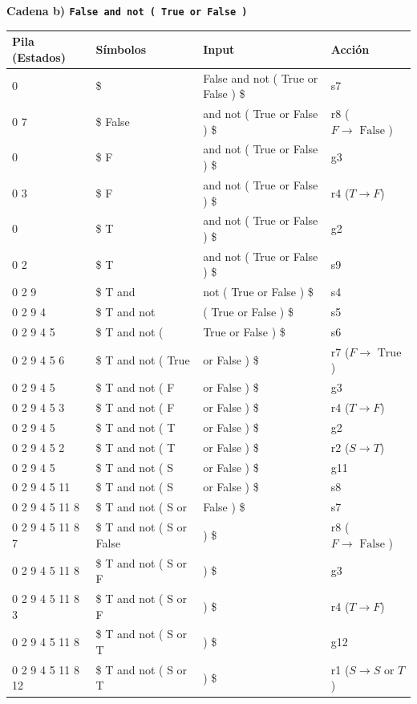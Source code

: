 \documentclass[12pt, letterpaper]{article}
\begin{document}
\begin{enumerate}
\textbf{Cadena b) \texttt{False and not ( True or False )}}

\begingroup\footnotesize
\begin{longtable}{p{3.6cm}p{4.0cm}p{4.5cm}>{\raggedright\arraybackslash}p{3.6cm}}
\toprule
\textbf{Pila (Estados)} & \textbf{Símbolos} & \textbf{Input} & \textbf{Acción} \\
\midrule
\endhead
0 & \$ & False and not ( True or False ) \$ & s7 \\
0 7 & \$ False & and not ( True or False ) \$ & r8 ($F \to \text{ False }$) \\
0 & \$ F & and not ( True or False ) \$ & g3 \\
0 3 & \$ F & and not ( True or False ) \$ & r4 ($T \to F$) \\
0 & \$ T & and not ( True or False ) \$ & g2 \\
0 2 & \$ T & and not ( True or False ) \$ & s9 \\
0 2 9 & \$ T and & not ( True or False ) \$ & s4 \\
0 2 9 4 & \$ T and not & ( True or False ) \$ & s5 \\
0 2 9 4 5 & \$ T and not ( & True or False ) \$ & s6 \\
0 2 9 4 5 6 & \$ T and not ( True & or False ) \$ & r7 ($F \to \text{ True }$) \\
0 2 9 4 5 & \$ T and not ( F & or False ) \$ & g3 \\
0 2 9 4 5 3 & \$ T and not ( F & or False ) \$ & r4 ($T \to F$) \\
0 2 9 4 5 & \$ T and not ( T & or False ) \$ & g2 \\
0 2 9 4 5 2 & \$ T and not ( T & or False ) \$ & r2 ($S \to T$) \\
0 2 9 4 5 & \$ T and not ( S & or False ) \$ & g11 \\
0 2 9 4 5 11 & \$ T and not ( S & or False ) \$ & s8 \\
0 2 9 4 5 11 8 & \$ T and not ( S or & False ) \$ & s7 \\
0 2 9 4 5 11 8 7 & \$ T and not ( S or False & ) \$ & r8 ($F \to \text{ False }$) \\
0 2 9 4 5 11 8 & \$ T and not ( S or F & ) \$ & g3 \\
0 2 9 4 5 11 8 3 & \$ T and not ( S or F & ) \$ & r4 ($T \to F$) \\
0 2 9 4 5 11 8 & \$ T and not ( S or T & ) \$ & g12 \\
0 2 9 4 5 11 8 12 & \$ T and not ( S or T & ) \$ & r1 ($S \to S \text{ or } T$) \\

\end{longtable}
\end{enumerate}
\end{document}
